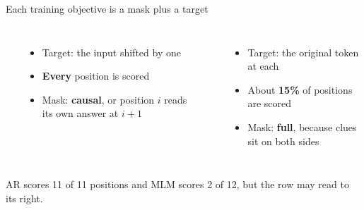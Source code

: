 \begin{frame}{Each training objective is a mask plus a target}
  \begin{columns}[T,onlytextwidth]
      \\[2mm]
      {\renewcommand{\toksize}{\scriptsize}\;\,\,\,\\[1mm]
      \;\,\,\,}\\[3mm]
      \begin{itemize}\small
        \item Target: the input shifted by one
        \item \textbf{Every} position is scored
        \item Mask: \textbf{causal}, or position $i$ reads its own answer at $i+1$
      \end{itemize}
      \\[2mm]
      {\renewcommand{\toksize}{\scriptsize}\;\,\,\,\tok[warm]{[MASK]}\\[1mm]
      \;\tok[muted]{--}\,\tok[muted]{--}\,\tok[muted]{--}\,}\\[3mm]
      \begin{itemize}\small
        \item Target: the original token at each \code{[MASK]}
        \item About \textbf{15\%} of positions are scored
        \item Mask: \textbf{full}, because clues sit on both sides
      \end{itemize}
  \end{columns}
  \vspace{2mm}
\end{frame}

  {AR scores 11 of 11 positions and MLM scores 2 of 12, but the \code{[MASK]} row may read  to its right.}

